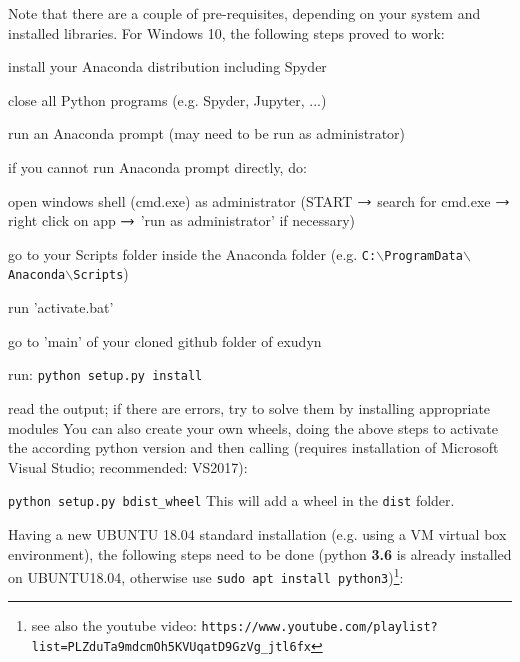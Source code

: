 
\label{sec:build:windows}
Note that there are a couple of pre-requisites, depending on your system and installed libraries. For Windows 10, the following steps proved to work:
\bi
  \item install your Anaconda distribution including Spyder
  \item close all Python programs (e.g. Spyder, Jupyter, ...)
	\item run an Anaconda prompt (may need to be run as administrator)
	\item if you cannot run Anaconda prompt directly, do:
	\bi
	  \item open windows shell (cmd.exe) as administrator (START $\rightarrow$ search for cmd.exe $\rightarrow$ right click on app $\rightarrow$ 'run as administrator' if necessary)
		\item go to your Scripts folder inside the Anaconda folder (e.g. \texttt{C:$\backslash$ProgramData$\backslash$Anaconda$\backslash$Scripts})
	  \item run 'activate.bat'
	\ei
	\item go to 'main' of your cloned github folder of exudyn
	\item run: \texttt{python setup.py install}
	\item read the output; if there are errors, try to solve them by installing appropriate modules
\ei
You can also create your own wheels, doing the above steps to activate the according python version and then calling (requires installation of Microsoft Visual Studio; recommended: VS2017):
\bi
  \item[] \texttt{python setup.py bdist\_wheel}
\ei
This will add a wheel in the \texttt{dist} folder.

\label{sec:build:ubuntu}
Having a new UBUNTU 18.04 standard installation (e.g. using a VM virtual box environment), the following steps need to be done (python {\bf 3.6} is already installed on UBUNTU18.04, otherwise use \texttt{sudo apt install python3})\footnote{see also the youtube video: \texttt{https://www.youtube.com/playlist?list=PLZduTa9mdcmOh5KVUqatD9GzVg\_jtl6fx}}:

